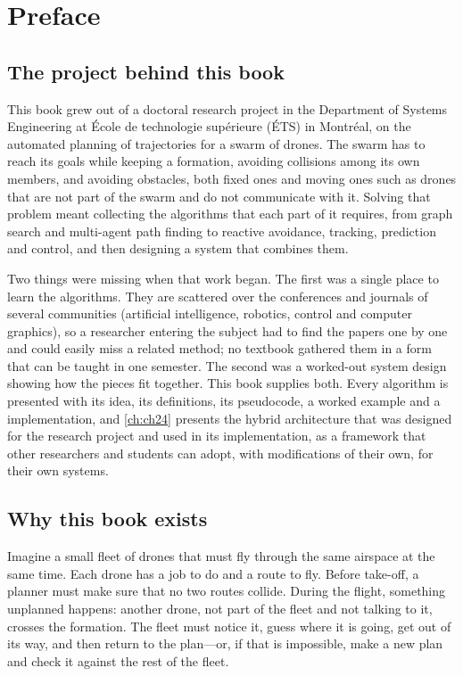 \chapter{Preface}

\section*{The project behind this book}

This book grew out of a doctoral research project in the Department of Systems
Engineering at École de technologie supérieure (ÉTS) in Montréal, on the automated
planning of trajectories for a swarm of drones. The swarm has to reach its goals while
keeping a formation, avoiding collisions among its own members, and avoiding obstacles,
both fixed ones and moving ones such as drones that are not part of the swarm and do
not communicate with it. Solving that problem meant collecting the algorithms that each
part of it requires, from graph search and multi-agent path finding to reactive
avoidance, tracking, prediction and control, and then designing a system that combines
them.

Two things were missing when that work began. The first was a single place to learn
the algorithms. They are scattered over the conferences and journals of several
communities (artificial intelligence, robotics, control and computer graphics), so a
researcher entering the subject had to find the papers one by one and could easily
miss a related method; no textbook gathered them in a form that can be taught in one
semester. The second was a worked-out system design showing how the pieces fit
together. This book supplies both. Every algorithm is presented with its idea, its
definitions, its pseudocode, a worked example and a \python{} implementation, and
\cref{ch:ch24} presents the hybrid architecture that was designed for the research
project and used in its implementation, as a framework that other researchers and
students can adopt, with modifications of their own, for their own systems.

\section*{Why this book exists}

Imagine a small fleet of drones that must fly through the same airspace at the same
time. Each drone has a job to do and a route to fly. Before take-off, a planner must
make sure that no two routes collide. During the flight, something unplanned happens:
another drone, not part of the fleet and not talking to it, crosses the formation. The
fleet must notice it, guess where it is going, get out of its way, and then return to
the plan---or, if that is impossible, make a new plan and check it against the rest of
the fleet.

